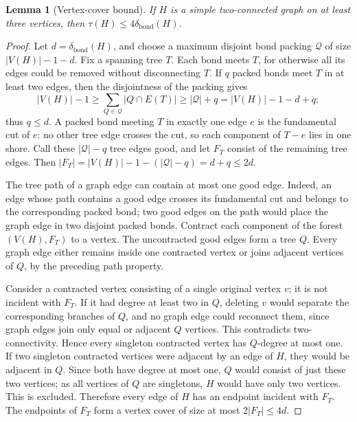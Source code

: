 \documentclass[11pt]{article}
\newtheorem{lemma}[theorem]{Lemma}
\newcommand{\bond}{\operatorname{bond}}
\begin{document}
\begin{lemma}[Vertex-cover bound]\label{lem:tau}
If $H$ is a simple two-connected graph on at least three vertices,
then $\tau(H)\leq4\delta_{\bond}(H)$.
\end{lemma}
\begin{proof}
Let $d=\delta_{\bond}(H)$, and choose a maximum disjoint bond
packing $\mathcal Q$ of size $|V(H)|-1-d$.  Fix a spanning tree $T$.
Each bond meets $T$, for otherwise all its edges could be removed
without disconnecting $T$.  If $q$ packed bonds meet $T$ in at least
two edges, then the disjointness of the packing gives
\[
 |V(H)|-1\geq\sum_{Q\in\mathcal Q}|Q\cap E(T)|
       \geq |\mathcal Q|+q=|V(H)|-1-d+q;
\]
thus $q\leq d$.  A packed bond meeting $T$ in exactly one edge $e$
is the fundamental cut of $e$: no other tree edge crosses the cut,
so each component of $T-e$ lies in one shore.  Call these
$|\mathcal Q|-q$ tree edges good, and let $F_T$
consist of the remaining tree edges.  Then
$|F_T|=|V(H)|-1-(|\mathcal Q|-q)=d+q\leq2d$.

The tree path of a graph edge can contain at most one good edge.
Indeed, an edge whose path contains a good edge crosses its
fundamental cut and belongs to the corresponding packed bond; two
good edges on the path would place the graph edge in two disjoint
packed bonds.  Contract each component of the forest $(V(H),F_T)$
to a vertex.  The uncontracted good edges form a tree $Q$.  Every
graph edge either remains inside one contracted vertex or joins
adjacent vertices of $Q$, by the preceding path property.

Consider a contracted vertex consisting of a single original vertex
$v$; it is not incident with $F_T$.  If it had degree at least two in
$Q$, deleting $v$ would separate the corresponding branches of
$Q$, and no graph edge could reconnect them, since graph edges join
only equal or adjacent $Q$ vertices.  This contradicts
two-connectivity.  Hence every singleton contracted vertex has
$Q$-degree at most one.  If two singleton contracted vertices were
adjacent by an edge of $H$, they would be adjacent in $Q$.  Since
both have degree at most one, $Q$ would consist of just these two
vertices; as all vertices of $Q$ are singletons, $H$ would have only
two vertices.  This is excluded.  Therefore every edge of $H$ has
an endpoint incident with $F_T$.  The endpoints of $F_T$ form a
vertex cover of size at most $2|F_T|\leq4d$.
\end{proof}
\end{document}
